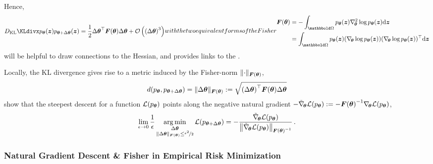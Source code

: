 Hence,
\begin{subequations}\label{eq:background::FisherOverview}
  \begin{align}
    \label{eq:background::KLDivergenceLocalFisher}
    \KLdiv{p_{\vtheta}(\vz)}{p_{\vtheta + \Delta \vtheta}(\vz)}
    =
    \frac{1}{2}
    {\Delta \vtheta}^{\top}
    \mF(\vtheta)
    \Delta \vtheta
    + \gO\left({(\Delta\vtheta)}^3\right)
  \end{align}
  with the two equivalent forms of the Fisher
  \begin{align}
    \label{eq:background::FisherHessianForm}
    \mF(\vtheta)
    &=
      - \int_{\sOmega} p_{\vtheta}(\vz)
      \gradsquared{\vtheta} \log p_{\vtheta}(\vz)
      \diff\vz
    \\
    \label{eq:background::FisherGradientForm}
    &= \int_{\sOmega} p_{\vtheta}(\vz)
      (\grad{\vtheta} \log p_{\vtheta}(\vz))
      (\grad{\vtheta} \log p_{\vtheta}(\vz))^{\top}
      \diff\vz
  \end{align}
\end{subequations}
 will be helpful to draw connections to
the Hessian, and  provides links to the
\ggn.

Locally, the KL divergence  gives
rise to a metric induced by the Fisher-norm $\lVert \cdot \rVert_{{\bm{F}}({\bm{\theta}})}$,
\begin{align}
  d(p_{{\bm{\theta}}}, p_{{\bm{\theta}} + \Delta{\bm{\theta}}})
  =
  \lVert \Delta{\bm{\theta}} \rVert_{{\bm{F}}({\bm{\theta}})}
  :=
  \sqrt{{(\Delta{\bm{\theta}})}^{\top} {\bm{F}}({\bm{\theta}}) \Delta{\bm{\theta}} }
\end{align}
\citet{ollivier2011information} show that the steepest descent for a function ${\mathcal{L}}(p_{{\bm{\theta}}})$ points along the negative natural gradient $-
\tilde{\nabla}_{\!{{\bm{\theta}}}}{\mathcal{L}}(p_{{\bm{\theta}}}) := - {{\bm{F}}({\bm{\theta}})}^{-1}
\nabla_{\!{{\bm{\theta}}}}{\mathcal{L}}(p_{{\bm{\theta}}})$,
\begin{align}
  \lim_{\epsilon \to 0}
  \frac{1}{\epsilon}
  \operatorname*{arg\,min}_{
  \substack{
  \Delta {\bm{\theta}}
  \\
  \lVert \Delta {\bm{\theta}}\rVert_{{\bm{F}}({\bm{\theta}})} \le \nicefrac{\epsilon^2}{2}}
  }
  {\mathcal{L}}(p_{{\bm{\theta}} + \Delta{\bm{\theta}}})
  =
  - \frac{
  \tilde{\nabla}_{\!{{\bm{\theta}}}}{\mathcal{L}}(p_{{\bm{\theta}}})
  }{
  \left\lVert
  \tilde{\nabla}_{\!{{\bm{\theta}}}}{\mathcal{L}}(p_{{\bm{\theta}}})
  \right\rVert_{{{\bm{F}}({\bm{\theta}})}^{-1}}
  }\,.
\end{align}

\subsubsection{Natural Gradient Descent \& Fisher in Empirical Risk Minimization}

